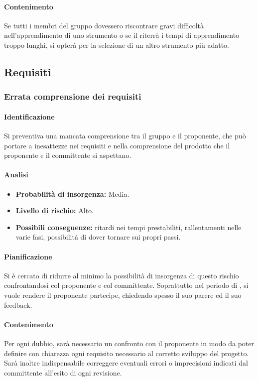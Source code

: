 \paragraph {Contenimento}
Se tutti i membri del gruppo dovessero riscontrare gravi difficoltà nell'apprendimento di uno strumento o se il \RdP{} riterrà i tempi di apprendimento troppo lunghi, si opterà per la selezione di un altro strumento più adatto.

\subsection{Requisiti}
\subsubsection{Errata comprensione dei requisiti}
\paragraph{Identificazione}
Si preventiva una mancata comprensione tra il gruppo e il proponente, che può portare a inesattezze nei requisiti e nella comprensione del prodotto che il proponente e il committente si aspettano.

\paragraph{Analisi}
\begin{itemize}
	\item \textbf{Probabilità di insorgenza:} Media.
	\item \textbf{Livello di rischio:} Alto.
	\item \textbf{Possibili conseguenze:} ritardi nei tempi prestabiliti, rallentamenti nelle varie fasi, possibilità di dover tornare sui propri passi.
\end{itemize}

\paragraph {Pianificazione}
Si è cercato di ridurre al minimo la possibilità di insorgenza di questo rischio confrontandosi col proponente e col committente. Soprattutto nel periodo di \AdR{}, si vuole rendere il proponente partecipe, chiedendo spesso il suo parere ed il suo feedback.

\paragraph {Contenimento}
Per ogni dubbio, sarà necessario un confronto con il proponente in modo da poter definire con chiarezza ogni requisito necessario al corretto sviluppo del progetto. Sarà inoltre indispensabile correggere eventuali errori o imprecisioni indicati dal committente all’esito di ogni revisione.